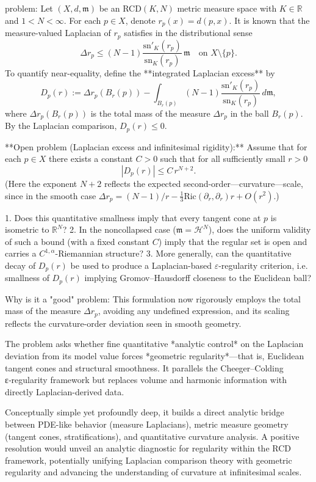 problem:  
Let \((X,d,\mathfrak{m})\) be an RCD\((K,N)\) metric measure space with \(K\in\mathbb{R}\) and \(1<N<\infty\).  
For each \(p\in X\), denote \(r_p(x)=d(p,x)\).  
It is known that the measure-valued Laplacian of \(r_p\) satisfies in the distributional sense
\[
\Delta r_p \le (N-1)\frac{\mathrm{sn}'_K(r_p)}{\mathrm{sn}_K(r_p)}\,\mathfrak{m}
\quad\text{on }X\setminus\{p\}.
\]
To quantify near-equality, define the **integrated Laplacian excess** by
\[
D_p(r)
:= \Delta r_p(B_r(p))
- \int_{B_r(p)} (N-1)\frac{\mathrm{sn}'_K(r_p)}{\mathrm{sn}_K(r_p)}\,d\mathfrak{m},
\]
where \(\Delta r_p(B_r(p))\) is the total mass of the measure \(\Delta r_p\) in the ball \(B_r(p)\).  
By the Laplacian comparison, \(D_p(r)\le0\).

**Open problem (Laplacian excess and infinitesimal rigidity):**  
Assume that for each \(p\in X\) there exists a constant \(C>0\) such that for all sufficiently small \(r>0\)
\[
|D_p(r)| \le C\, r^{N+2}.
\]
(Here the exponent \(N+2\) reflects the expected second-order—curvature—scale, since in the smooth case  
\(\Delta r_p=(N-1)/r - \tfrac{1}{3}\mathrm{Ric}(\partial_r,\partial_r)r + O(r^2)\).)

1. Does this quantitative smallness imply that every tangent cone at \(p\) is isometric to \(\mathbb{R}^N\)?  
2. In the noncollapsed case (\(\mathfrak{m}=\mathcal{H}^N\)), does the uniform validity of such a bound (with a fixed constant \(C\)) imply that the regular set is open and carries a \(C^{1,\alpha}\)-Riemannian structure?  
3. More generally, can the quantitative decay of \(D_p(r)\) be used to produce a Laplacian-based \(\varepsilon\)-regularity criterion, i.e. smallness of \(D_p(r)\) implying Gromov–Hausdorff closeness to the Euclidean ball?

Why is it a "good" problem:  
This formulation now rigorously employs the total mass of the measure \(\Delta r_p\), avoiding any undefined expression, and its scaling reflects the curvature-order deviation seen in smooth geometry.  

The problem asks whether fine quantitative *analytic control* on the Laplacian deviation from its model value forces *geometric regularity*—that is, Euclidean tangent cones and structural smoothness. It parallels the Cheeger–Colding ε‑regularity framework but replaces volume and harmonic information with directly Laplacian-derived data.  

Conceptually simple yet profoundly deep, it builds a direct analytic bridge between PDE-like behavior (measure Laplacians), metric measure geometry (tangent cones, stratifications), and quantitative curvature analysis. A positive resolution would unveil an analytic diagnostic for regularity within the RCD framework, potentially unifying Laplacian comparison theory with geometric regularity and advancing the understanding of curvature at infinitesimal scales.